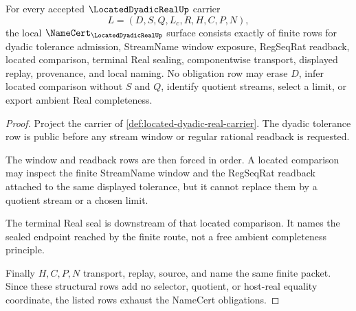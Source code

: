 \begin{theorem}
\label{thm:located-dyadic-real-namecert-obligations}
For every accepted $\LocatedDyadicRealUp$ carrier
$$
L=(D,S,Q,L_c,R,H,C,P,N),
$$
the local $\NameCert_{\LocatedDyadicRealUp}$ surface consists exactly of finite rows for dyadic tolerance admission, StreamName window exposure, RegSeqRat readback, located comparison, terminal Real sealing, componentwise transport, displayed replay, provenance, and local naming. No obligation row may erase $D$, infer located comparison without $S$ and $Q$, identify quotient streams, select a limit, or export ambient Real completeness.
\end{theorem}
\begin{proof}
Project the carrier of \autoref{def:located-dyadic-real-carrier}. The dyadic tolerance row is public before any stream window or regular rational readback is requested.

The window and readback rows are then forced in order. A located comparison may inspect the finite StreamName window and the RegSeqRat readback attached to the same displayed tolerance, but it cannot replace them by a quotient stream or a chosen limit.

The terminal Real seal is downstream of that located comparison. It names the sealed endpoint reached by the finite route, not a free ambient completeness principle.

Finally $H,C,P,N$ transport, replay, source, and name the same finite packet. Since these structural rows add no selector, quotient, or host-real equality coordinate, the listed rows exhaust the NameCert obligations.
\end{proof}

